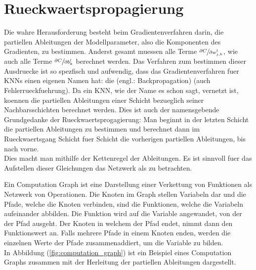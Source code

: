 \section{Rueckwaertspropagierung}\label{sec:backpropagation}
Die wahre Herausforderung besteht beim Gradientenverfahren darin,
die partiellen Ableitungen der Modellparameter,
also die Komponenten des Gradienten, zu bestimmen.
Anderst gesamt muessen alle Terme
$\sfrac{\partial C}{\partial w_{j,k}^l}$, wie auch alle Terme $\sfrac{\partial C}{\partial b_k^l}$
berechnet werden.
Das Verfahren zum bestimmen dieser Ausdruecke ist so spezfisch und aufwendig,
dass das Gradientenverfahren fuer KNNs einen eigenen Namen hat: die
 (engl.: Backpropagation) (auch Fehlerrueckfuehrung).
\para{}
Da ein KNN, wie der Name es schon sagt, vernetzt ist, koennen die partiellen
Ableitungen einer Schicht bezueglich seiner Nachbarsschichten berechnet werden.
Dies ist auch der namensgebende Grundgedanke der Rueckwaertsprogagierung: Man
beginnt in der letzten Schicht die partiellen Ableitungen zu bestimmen und
berechnet dann im Rueckwaertsgang Schicht fuer Schicht die vorherigen
partiellen Ableitungen, bis nach vorne. \\
Dies macht man mithilfe der Kettenregel der Ableitungen.
Es ist sinnvoll fuer das Aufstellen dieser Gleichungen das Netzwerk als
 zu betrachten.
\para{}

Ein Computation Graph ist eine Darstellung einer Verkettung von Funktionen als Netzwerk von Operationen.
Die Knoten im Graph stellen Variabeln dar und die Pfade, welche die Knoten
verbinden, sind die Funktionen, welche die Variabeln aufeinander abbilden. Die
Funktion wird auf die Variable angewandet, von der der Pfad ausgeht. Der Knoten
in welchem der Pfad endet, nimmt dann den Funktionswert an. Falls
mehrere Pfade in einem Knoten enden, werden die einzelnen Werte der Pfade
zusammenaddiert, um die Variable zu bilden. \\
In Abbildung (\ref{fig:computation_graph}) ist ein Beispiel eines Computation
Graphs zusammen mit der Herleitung der partiellen Ableitungen dargestellt.

